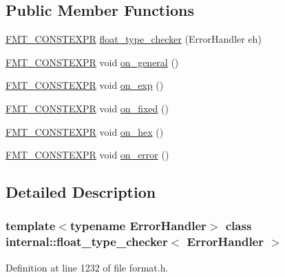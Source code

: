 \subsection*{Public Member Functions}
\begin{DoxyCompactItemize}
\item 
\hyperlink{core_8h_a69201cb276383873487bf68b4ef8b4cd}{F\+M\+T\+\_\+\+C\+O\+N\+S\+T\+E\+X\+PR} \hyperlink{classinternal_1_1float__type__checker_a33869a64495ed6f3a54b6101baf35f51}{float\+\_\+type\+\_\+checker} (Error\+Handler eh)
\item 
\hyperlink{core_8h_a69201cb276383873487bf68b4ef8b4cd}{F\+M\+T\+\_\+\+C\+O\+N\+S\+T\+E\+X\+PR} void \hyperlink{classinternal_1_1float__type__checker_a8503b503710b9df4205d41f99c8f9f1b}{on\+\_\+general} ()
\item 
\hyperlink{core_8h_a69201cb276383873487bf68b4ef8b4cd}{F\+M\+T\+\_\+\+C\+O\+N\+S\+T\+E\+X\+PR} void \hyperlink{classinternal_1_1float__type__checker_a22fe183efa70f61a4e4a2bc7311f8074}{on\+\_\+exp} ()
\item 
\hyperlink{core_8h_a69201cb276383873487bf68b4ef8b4cd}{F\+M\+T\+\_\+\+C\+O\+N\+S\+T\+E\+X\+PR} void \hyperlink{classinternal_1_1float__type__checker_a00c9789b9c02c3e30fe59d3fd0fc7bae}{on\+\_\+fixed} ()
\item 
\hyperlink{core_8h_a69201cb276383873487bf68b4ef8b4cd}{F\+M\+T\+\_\+\+C\+O\+N\+S\+T\+E\+X\+PR} void \hyperlink{classinternal_1_1float__type__checker_a877290cd3cd66c89bccb98dd2fcaf364}{on\+\_\+hex} ()
\item 
\hyperlink{core_8h_a69201cb276383873487bf68b4ef8b4cd}{F\+M\+T\+\_\+\+C\+O\+N\+S\+T\+E\+X\+PR} void \hyperlink{classinternal_1_1float__type__checker_a3d56c9954f41916b21c3fb9d7a7f8f11}{on\+\_\+error} ()
\end{DoxyCompactItemize}


\subsection{Detailed Description}
\subsubsection*{template$<$typename Error\+Handler$>$\newline
class internal\+::float\+\_\+type\+\_\+checker$<$ Error\+Handler $>$}



Definition at line 1232 of file format.\+h.



